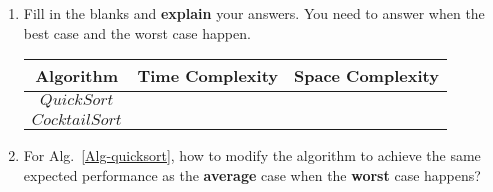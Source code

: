 \documentclass[12pt,a4paper]{article}
\makeatletter
\newtheorem*{solution}{Solution}
\theoremstyle{definition}
\renewenvironment{solution}[1][Solution] {\par\pushQED{\qed}\normalfont\topsep6\p@\@plus6\p@\relax\trivlist\item[\hskip\labelsep\bfseries#1\@addpunct{.}]\ignorespaces}{\popQED\endtrivlist\@endpefalse} \makeatother
\makeatother
\begin{document}
\begin{enumerate}
\begin{minipage}[t]{0.45\textwidth}
\begin{algorithm}[H]
		$i\leftarrow i+1$\;
	}
\end{algorithm}
\end{minipage}

\begin{enumerate}
	 
\item Fill in the blanks and \textbf{explain} your answers. You need to answer when the best case and the worst case happen. 
\begin{table}[!h]

\label{Tab-compare}
	\centering
	\begin{threeparttable}
	\begin{tabular}{c|c| c }
		\toprule[2pt]
		\textbf{Algorithm} & \textbf{Time Complexity}\tnote{1} & \textbf{Space Complexity} \\
		\hline
		\hline
		$QuickSort$ &  &  \\

		$CocktailSort$ &  &   \\
		\bottomrule[2pt]


	\end{tabular}
	\end{threeparttable}
\end{table}

\item For Alg.~\ref{Alg-quicksort}, how to modify the algorithm to achieve the same expected performance as the \textbf{average} case when the \textbf{worst} case happens?
\end{enumerate} 


\end{enumerate}
\end{document}
